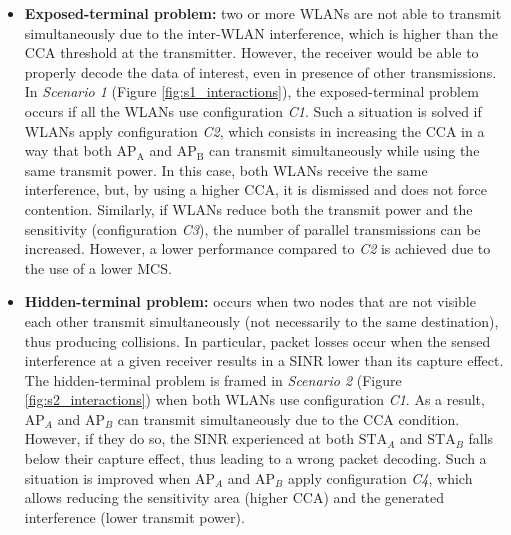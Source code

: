\documentclass[preprint,12pt]{elsarticle}
\begin{document}
\begin{itemize}		
	\item \textbf{Exposed-terminal problem:} two or more WLANs are not able to transmit simultaneously due to the inter-WLAN interference, which is higher than the CCA threshold at the transmitter. However, the receiver would be able to properly decode the data of interest, even in presence of other transmissions. In \emph{Scenario 1} (Figure \ref{fig:s1_interactions}), the exposed-terminal problem occurs if all the WLANs use configuration \emph{C1}. Such a situation is solved if WLANs apply configuration \emph{C2}, which consists in increasing the CCA in a way that both $\text{AP}_\text{A}$ and $\text{AP}_\text{B}$ can transmit simultaneously while using the same transmit power. In this case, both WLANs receive the same interference, but, by using a higher CCA, it is dismissed and does not force contention. Similarly, if WLANs reduce both the transmit power and the sensitivity (configuration \emph{C3}), the number of parallel transmissions can be increased. However, a lower performance compared to \emph{C2} is achieved due to the use of a lower MCS.		
	\item \textbf{Hidden-terminal problem:} occurs when two nodes that are not visible each other transmit simultaneously (not necessarily to the same destination), thus producing collisions. In particular, packet losses occur when the sensed interference at a given receiver results in a SINR lower than its capture effect. The hidden-terminal problem is framed in \emph{Scenario 2} (Figure \ref{fig:s2_interactions}) when both WLANs use configuration \emph{C1}. As a result, $\text{AP}_A$ and $\text{AP}_B$ can transmit simultaneously due to the CCA condition. However, if they do so, the SINR experienced at both $\text{STA}_A$ and $\text{STA}_B$ falls below their capture effect, thus leading to a wrong packet decoding. Such a situation is improved when $\text{AP}_A$ and $\text{AP}_B$ apply configuration \emph{C4}, which allows reducing the sensitivity area (higher CCA) and the generated interference (lower transmit power).		

\end{itemize}
\end{document}
